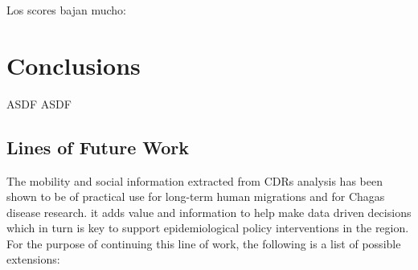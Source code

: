 %
Los scores bajan mucho:
%



\section{Conclusions}\label{section:conclusions}

ASDF ASDF

\subsection{ Lines of Future Work }

The mobility and social information extracted from CDRs analysis has been shown to be of practical use for long-term human migrations and for Chagas disease research.
it adds value and information to help make data driven decisions which in turn is key to support epidemiological policy interventions in the region.
For the purpose of continuing this line of work, the following is a list of possible extensions:

